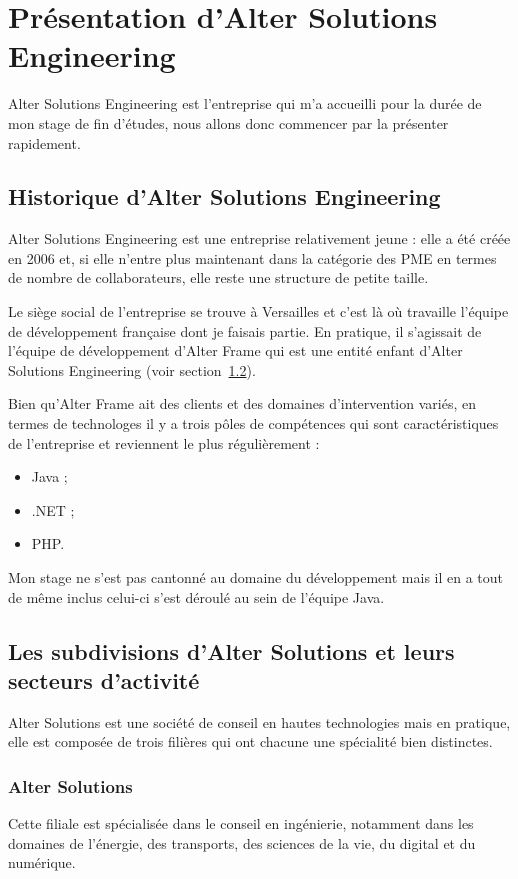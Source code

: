 \section{Présentation d'Alter Solutions Engineering} 
Alter Solutions Engineering est l'entreprise qui m'a accueilli pour la durée de mon stage de fin d'études, nous allons donc commencer par la présenter rapidement.

\subsection{Historique d'Alter Solutions Engineering}
Alter Solutions Engineering est une entreprise relativement jeune : elle a été créée en 2006 et, si elle n'entre plus maintenant dans la catégorie des PME en termes de nombre de collaborateurs, elle reste une structure de petite taille.

Le siège social de l'entreprise se trouve à Versailles et c'est là où travaille l'équipe de développement française dont je faisais partie. En pratique, il s'agissait de l'équipe de développement d'Alter Frame qui est une entité enfant d'Alter Solutions Engineering (voir section~\ref{subsec:subdivisions}).

Bien qu'Alter Frame ait des clients et des domaines d'intervention variés, en termes de technologes il y a trois pôles de compétences qui sont caractéristiques de l'entreprise et reviennent le plus régulièrement :
\begin{itemize}[label=$\bullet$]
\item Java ;
\item .NET ;
\item PHP.
\end{itemize}

Mon stage ne s'est pas cantonné au domaine du développement mais il en a tout de
même inclus celui-ci s'est déroulé au sein de l'équipe Java.

\subsection{Les subdivisions d'Alter Solutions et leurs secteurs d'activité}
\label{subsec:subdivisions}
Alter Solutions est une société de conseil en hautes technologies mais en pratique, elle est composée de trois filières qui ont chacune une spécialité bien distinctes.

\subsubsection{Alter Solutions}
Cette filiale est spécialisée dans le conseil en ingénierie, notamment dans les domaines de l'énergie, des transports, des sciences de la vie, du digital et du numérique.

